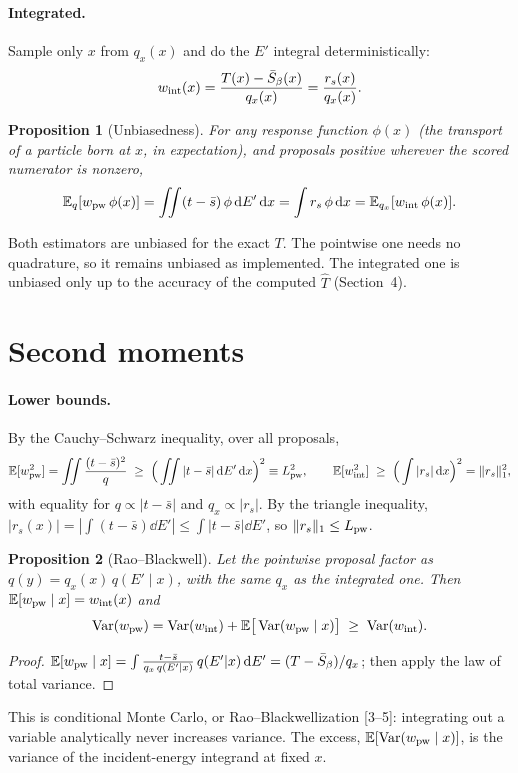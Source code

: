 \documentclass[11pt]{article}
\newtheorem{proposition}{Proposition}
\newcommand{\Sbar}{\bar S}
\newcommand{\E}{\mathbb{E}}
\newcommand{\Var}{\operatorname{Var}}
\begin{document}
\paragraph{Integrated.} Sample only $x$ from $q_x(x)$ and do the $E'$ integral
deterministically:
\begin{equation}
  w_{\rm int}(x) = \frac{T(x) - \Sbar_\beta(x)}{q_x(x)} = \frac{r_s(x)}{q_x(x)} .
  \label{eq:integrated}
\end{equation}

\begin{proposition}[Unbiasedness]
For any response function $\phi(x)$ (the transport of a particle born at $x$, in
expectation), and proposals positive wherever the scored numerator is nonzero,
\[
  \E_q[w_{\rm pw}\,\phi(x)] = \iint (t - \bar s)\,\phi\dd E'\dd x
  = \int r_s\,\phi\dd x = \E_{q_x}[w_{\rm int}\,\phi(x)] .
\]
\end{proposition}
\noindent Both estimators are unbiased for the exact $T$. The pointwise one needs no
quadrature, so it remains unbiased as implemented. The integrated one is unbiased only
up to the accuracy of the computed $\widehat T$ (Section~4).

\section{Second moments}

\paragraph{Lower bounds.} By the Cauchy--Schwarz inequality, over all proposals,
\begin{equation}
  \E[w_{\rm pw}^2] = \iint\frac{(t-\bar s)^2}{q}
  \;\ge\; \Big(\iint|t-\bar s|\dd E'\dd x\Big)^2 \equiv L_{\rm pw}^2,
  \qquad
  \E[w_{\rm int}^2] \;\ge\; \Big(\int|r_s|\dd x\Big)^2 = \|r_s\|_1^2,
\end{equation}
with equality for $q\propto|t-\bar s|$ and $q_x\propto|r_s|$. By the triangle
inequality, $|r_s(x)| = |\int(t-\bar s)\dd E'| \le \int|t-\bar s|\dd E'$, so
$\|r_s\|_1 \le L_{\rm pw}$.

\begin{proposition}[Rao--Blackwell]
Let the pointwise proposal factor as $q(y) = q_x(x)\,q(E'\mid x)$, with the same $q_x$
as the integrated one. Then $\E[w_{\rm pw}\mid x] = w_{\rm int}(x)$ and
\[
  \Var(w_{\rm pw}) = \Var(w_{\rm int}) + \E\big[\Var(w_{\rm pw}\mid x)\big]
  \;\ge\; \Var(w_{\rm int}).
\]
\end{proposition}
\begin{proof}
$\E[w_{\rm pw}\mid x] = \int \frac{t-\bar s}{q_x\,q(E'|x)}\,q(E'|x)\dd E'
= (T-\Sbar_\beta)/q_x$; then apply the law of total variance.
\end{proof}
\noindent This is conditional Monte Carlo, or Rao--Blackwellization [3--5]: integrating
out a variable analytically never increases variance. The excess,
$\E[\Var(w_{\rm pw}\mid x)]$, is the variance of the incident-energy integrand at fixed
$x$.
\end{document}
